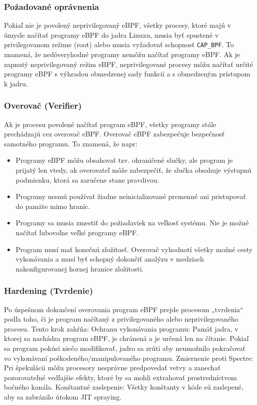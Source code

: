 \subsubsection*{Požadované oprávnenia}
Pokiaľ nie je povolený neprivilegovaný eBPF, všetky procesy, ktoré majú v úmysle načítať programy eBPF do jadra Linuxu, 
musia byť spustené v privilegovanom režime (root) alebo musia vyžadovať schopnosť \texttt{CAP\_BPF}. To znamená, 
že nedôveryhodné programy nemôžu načítať programy eBPF. Ak je zapnutý neprivilegovaný režim eBPF, neprivilegované 
procesy môžu načítať určité programy eBPF s výhradou obmedzenej sady funkcií a s obmedzeným prístupom k jadru.

\subsubsection*{Overovač (Verifier)}
Ak je procesu povolené načítať program eBPF, všetky programy stále prechádzajú cez overovač eBPF. 
Overovač eBPF zabezpečuje bezpečnosť samotného programu. To znamená, že napr:
\begin{itemize}
\item Programy eBPF môžu obsahovať tzv. ohraničené slučky, ale program je prijatý len vtedy, 
ak overovateľ môže zabezpečiť, že slučka obsahuje výstupnú podmienku, ktorá sa zaručene stane pravdivou.
\item Programy nesmú používať žiadne neinicializované premenné ani pristupovať do pamäte mimo hraníc.
\item Programy sa musia zmestiť do požiadaviek na veľkosť systému. Nie je možné načítať ľubovoľne veľké programy eBPF.
\item Program musí mať konečnú zložitosť. Overovač vyhodnotí všetky možné cesty vykonávania a musí byť schopný dokončiť 
analýzu v medziach nakonfigurovanej hornej hranice zložitosti.
\end{itemize}

\subsubsection*{Hardening (Tvrdenie)}
Po úspešnom dokončení overovania program eBPF prejde procesom „tvrdenia“ podľa toho, či je program načítaný z privilegovaného 
alebo neprivilegovaného procesu. 
Tento krok zahŕňa:
Ochranu vykonávania programu: 
Pamäť jadra, v ktorej sa nachádza program eBPF, je chránená a je určená len na čítanie. Pokiaľ sa program pokúsi niečo modifikovať, 
jadro sa zrúti aby neumožnilo pokračovať vo vykonávaní poškodeného/manipulovaného programu.
Zmiernenie proti Spectre: 
Pri špekulácii môžu procesory nesprávne predpovedať vetvy a zanechať pozorovateľné vedľajšie efekty, ktoré by sa mohli 
extrahovať prostredníctvom bočného kanála.
Konštantné zaslepenie: 
Všetky konštanty v kóde sú zaslepené, aby sa zabránilo útokom JIT spraying.

